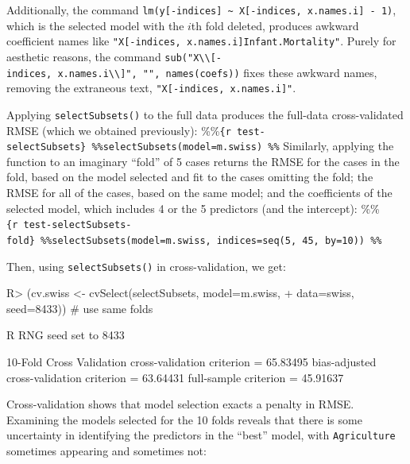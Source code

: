 \documentclass[
]{jss}
\begin{document}
Additionally, the command
\texttt{lm(y{[}-indices{]}\ \textasciitilde{}\ X{[}-indices,\ x.names.i{]}\ -\ 1)},
which is the selected model with the \(i\)th fold deleted, produces
awkward coefficient names like
\texttt{"X{[}-indices,\ x.names.i{]}Infant.Mortality"}. Purely for
aesthetic reasons, the command
\texttt{sub("X\textbackslash{}\textbackslash{}{[}-indices,\ x.names.i\textbackslash{}\textbackslash{}{]}",\ "",\ names(coefs))}
fixes these awkward names, removing the extraneous text,
\texttt{"X{[}-indices,\ x.names.i{]}"}.

Applying \texttt{selectSubsets()} to the full data produces the
full-data cross-validated RMSE (which we obtained previously):
\%\%\texttt{\{r\ test-selectSubsets\}\ \%\%selectSubsets(model=m.swiss)\ \%\%}
Similarly, applying the function to an imaginary ``fold'' of 5 cases
returns the RMSE for the cases in the fold, based on the model selected
and fit to the cases omitting the fold; the RMSE for all of the cases,
based on the same model; and the coefficients of the selected model,
which includes 4 or the 5 predictors (and the intercept):
\%\%\texttt{\{r\ test-selectSubsets-fold\}\ \%\%selectSubsets(model=m.swiss,\ indices=seq(5,\ 45,\ by=10))\ \%\%}

Then, using \texttt{selectSubsets()} in cross-validation, we get:

\begin{CodeChunk}
\begin{CodeInput}
R> (cv.swiss <- cvSelect(selectSubsets, model=m.swiss,
+                       data=swiss, seed=8433)) # use same folds
\end{CodeInput}
\begin{CodeOutput}
R RNG seed set to 8433
\end{CodeOutput}
\begin{CodeOutput}
10-Fold Cross Validation
cross-validation criterion = 65.83495
bias-adjusted cross-validation criterion = 63.64431
full-sample criterion = 45.91637 
\end{CodeOutput}
\end{CodeChunk}

Cross-validation shows that model selection exacts a penalty in RMSE.
Examining the models selected for the 10 folds reveals that there is
some uncertainty in identifying the predictors in the ``best'' model,
with \texttt{Agriculture} sometimes appearing and sometimes not:
\end{document}
